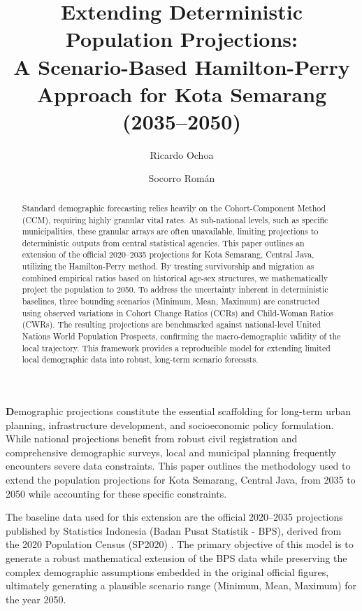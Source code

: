 \documentclass[11pt, a4paper, twocolumn]{article}
\title{Extending Deterministic Population Projections:\\ \large A Scenario-Based Hamilton-Perry Approach for Kota Semarang (2035--2050)}
\author[1,2*]{Ricardo Ochoa}
\author[1]{Socorro Román}
\affil[1]{CAPSUS}
\newcommand{\storedsig}{}
\newcommand{\storedcorr}{}
\newcommand{\storedkeys}{}
\newcommand{\storeddates}{}
\newcommand{\dropcap}[1]{\noindent\textbf{\Large #1}}
\let\oldmaketitle\maketitle
\renewcommand{\maketitle}{%
  \oldmaketitle
  \storedsig
  \storedcorr
  \storedkeys
  \storeddates
}
\begin{document}
\maketitle

\begin{abstract}
Standard demographic forecasting relies heavily on the Cohort-Component Method (CCM), requiring highly granular vital rates. At sub-national levels, such as specific municipalities, these granular arrays are often unavailable, limiting projections to deterministic outputs from central statistical agencies. This paper outlines an extension of the official 2020--2035 projections for Kota Semarang, Central Java, utilizing the Hamilton-Perry method. By treating survivorship and migration as combined empirical ratios based on historical age-sex structures, we mathematically project the population to 2050. To address the uncertainty inherent in deterministic baselines, three bounding scenarios (Minimum, Mean, Maximum) are constructed using observed variations in Cohort Change Ratios (CCRs) and Child-Woman Ratios (CWRs). The resulting projections are benchmarked against national-level United Nations World Population Prospects, confirming the macro-demographic validity of the local trajectory. This framework provides a reproducible model for extending limited local demographic data into robust, long-term scenario forecasts.
\end{abstract}

\dropcap{D}emographic projections constitute the essential scaffolding for long-term urban planning, infrastructure development, and socioeconomic policy formulation. While national projections benefit from robust civil registration and comprehensive demographic surveys, local and municipal planning frequently encounters severe data constraints. This paper outlines the methodology used to extend the population projections for Kota Semarang, Central Java, from 2035 to 2050 while accounting for these specific constraints.

The baseline data used for this extension are the official 2020--2035 projections published by Statistics Indonesia (Badan Pusat Statistik - BPS), derived from the 2020 Population Census (SP2020) \cite{bps2020}. The primary objective of this model is to generate a robust mathematical extension of the BPS data while preserving the complex demographic assumptions embedded in the original official figures, ultimately generating a plausible scenario range (Minimum, Mean, Maximum) for the year 2050.
\end{document}
